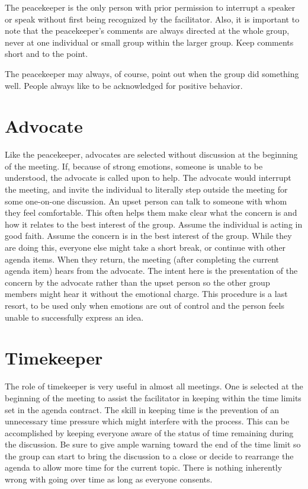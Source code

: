 The peacekeeper is the only person with prior permission to
interrupt a speaker or speak without first being recognized by the
facilitator. Also, it is important to note that the peacekeeper's
comments are always directed at the whole group, never at one
individual or small group within the larger group. Keep comments
short and to the point.


The peacekeeper may always, of course, point out when the group
did something well. People always like to be acknowledged for
positive behavior.


\section{Advocate}
Like the peacekeeper, advocates are selected without discussion at
the beginning of the meeting. If, because of strong emotions,
someone is unable to be understood, the advocate is called upon to
help. The advocate would interrupt the meeting, and invite the
individual to literally step outside the meeting for some
one-on-one discussion. An upset person can talk to someone with
whom they feel comfortable. This often helps them make clear what
the concern is and how it relates to the best interest of the
group.  Assume the individual is acting in good faith. Assume the
concern is in the best interest of the group. While they are doing
this, everyone else might take a short break, or continue with
other agenda items. When they return, the meeting (after completing
the current agenda item) hears from the advocate. The intent here
is the presentation of the concern by the advocate rather than the
upset person so the other group members might hear it without the
emotional charge. This procedure is a last resort, to be used only
when emotions are out of control and the person feels unable to
successfully express an idea.


\section{Timekeeper}
\label{role:timekeeper}

The role of timekeeper is very useful in almost all meetings. One
is selected at the beginning of the meeting to assist the
facilitator in keeping within the time limits set in the agenda
contract. The skill in keeping time is the prevention of an
unnecessary time pressure which might interfere with the
process. This can be accomplished by keeping everyone aware of the
status of time remaining during the discussion. Be sure to give
ample warning toward the end of the time limit so the group can
start to bring the discussion to a close or decide to rearrange
the agenda to allow more time for the current topic. There is
nothing inherently wrong with going over time as long as everyone
consents.


